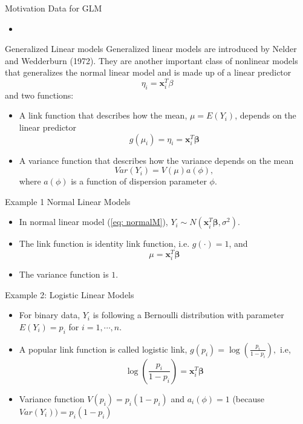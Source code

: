 \documentclass{beamer}
\begin{document}
     \begin{frame}{Motivation Data for GLM}
        \begin{itemize}
            \item 
        \end{itemize}
    \end{frame}
    
    
    
      \begin{frame}{Generalized Linear models}
      Generalized linear models are introduced by Nelder and Wedderburn (1972). They are another important class of nonlinear models that generalizes the normal linear model and is made up of a linear predictor $$\eta_{i} = \mathbf{x}^{T}_{i}\beta$$ and two functions:
        \begin{itemize}
        \item A link function that describes how the mean, $\mu = E(Y_{i})$,  depends on the linear predictor $$ g(\mu_{i}) = \eta_{i} = \mathbf{x}^{T}_{i}\boldsymbol{\beta}$$
        \item A variance function that describes how the variance depends on the mean
        $$Var(Y_{i}) = V(\mu)a(\phi),$$
        where $a(\phi)$ is a function of dispersion parameter $\phi$. 
        \end{itemize}
    \end{frame}
    
     
         \begin{frame}{Example 1 Normal Linear Models}
         \begin{itemize}
         \item In normal linear model (\ref{eq: normalM}), $Y_{i} \sim N(\mathbf{x}^{T}_{i}\boldsymbol{\beta}, \sigma^{2})$.
        \item The link function is identity link function, i.e. $g(\cdot) = 1$, and
        $$\mu = \mathbf{x}^{T}_{i}\boldsymbol{\beta}$$
        \item The variance function is $1$.
        \end{itemize}
        \end{frame}
        
        
        \begin{frame}{Example 2: Logistic Linear Models}
        \begin{itemize}
         \item For binary data, $Y_{i}$ is following a Bernoulli distribution with parameter $E(Y_{i}) = p_{i}$ for $i = 1, \cdots, n$.
        \item A popular link function is called logistic link, $g(p_{i}) = \log\left(\frac{p_{i}}{1-p_{i}}\right),$ i.e, 
        $$\log\left(\frac{p_{i}}{1-p_{i}}\right) = \mathbf{x}^{T}_{i}\boldsymbol{\beta}$$
        \item Variance function $V(p_{i}) = p_{i}(1-p_{i})$ and $a_{i}(\phi) = 1$ (because $Var(Y_{i})) = p_{i}(1-p_{i})$
        \end{itemize}
        \end{frame}
        
\end{document}
